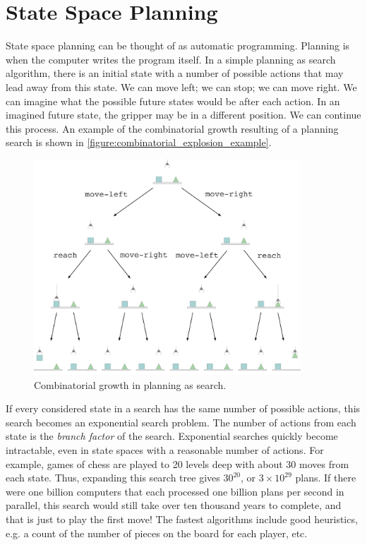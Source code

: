 \section{State Space Planning}

State space planning can be thought of as automatic programming.
Planning is when the computer writes the program itself.  In a simple
planning as search algorithm, there is an initial state with a number
of possible actions that may lead away from this state.  We can move
left; we can stop; we can move right.  We can imagine what the
possible future states would be after each action.  In an imagined
future state, the gripper may be in a different position.  We can
continue this process.  An example of the combinatorial growth
resulting of a planning search is shown in
\autoref{figure:combinatorial_explosion_example}.
\begin{figure}
\center
\includegraphics[width=10cm]{gfx/combinatorial_explosion_example}
\caption{Combinatorial growth in planning as search.}
\label{figure:combinatorial_explosion_example}
\end{figure}
If every considered state in a search has the same number of possible
actions, this search becomes an exponential search problem.  The
number of actions from each state is the \emph{branch factor} of the
search.  Exponential searches quickly become intractable, even in
state spaces with a reasonable number of actions.  For example, games
of chess are played to 20 levels deep with about 30 moves from each
state.  Thus, expanding this search tree gives $30^{20}$, or $3 \times
10^{29}$ plans.  If there were one billion computers that each
processed one billion plans per second in parallel, this search would
still take over ten thousand years to complete, and that is just to
play the first move!  The fastest algorithms include good heuristics,
e.g. a count of the number of pieces on the board for each player,
etc.

